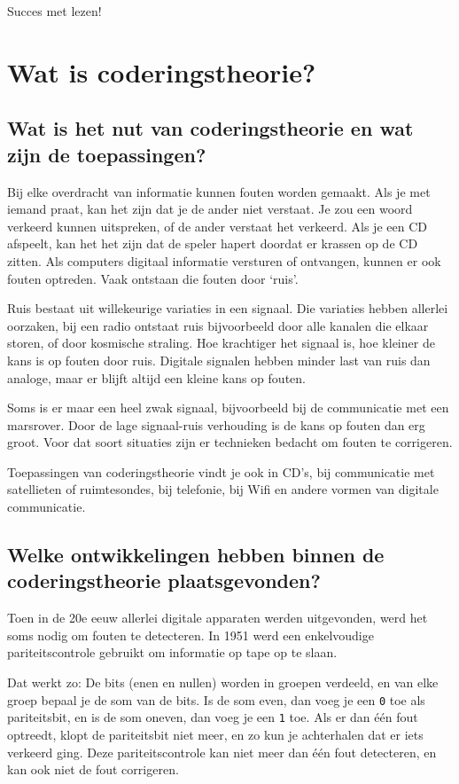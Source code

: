 \documentclass[a4paper]{article}
\begin{document}
Succes met lezen!

\section{Wat is coderingstheorie?}
\subsection{Wat is het nut van coderingstheorie en wat zijn de toepassingen?}
Bij elke overdracht van informatie kunnen fouten worden gemaakt. Als je met iemand praat, kan het zijn dat je de ander niet verstaat. Je zou een woord verkeerd kunnen uitspreken, of de ander verstaat het verkeerd. Als je een CD afspeelt, kan het het zijn dat de speler hapert doordat er krassen op de CD zitten. Als computers digitaal informatie versturen of ontvangen, kunnen er ook fouten optreden. Vaak ontstaan die fouten door ‘ruis’.

Ruis bestaat uit willekeurige variaties in een signaal. Die variaties hebben allerlei oorzaken, bij een radio ontstaat ruis bijvoorbeeld door alle kanalen die elkaar storen, of door kosmische straling. Hoe krachtiger het signaal is, hoe kleiner de kans is op fouten door ruis. Digitale signalen hebben minder last van ruis dan analoge, maar er blijft altijd een kleine kans op fouten.

Soms is er maar een heel zwak signaal, bijvoorbeeld bij de communicatie met een marsrover. Door de lage signaal-ruis verhouding is de kans op fouten dan erg groot. Voor dat soort situaties zijn er technieken bedacht om fouten te corrigeren.

Toepassingen van coderingstheorie vindt je ook in CD's, bij communicatie met satellieten of ruimtesondes, bij telefonie, bij Wifi en andere vormen van digitale communicatie.
\subsection{Welke ontwikkelingen hebben binnen de coderingstheorie plaatsgevonden?}
Toen in de 20e eeuw allerlei digitale apparaten werden uitgevonden, werd het soms nodig om fouten te detecteren. In 1951 werd een enkelvoudige pariteitscontrole gebruikt om informatie op tape op te slaan.

Dat werkt zo: De bits (enen en nullen) worden in groepen verdeeld, en van elke groep bepaal je de som van de bits. Is de som even, dan voeg je een \texttt{0} toe als pariteitsbit, en is de som oneven, dan voeg je een \texttt{1} toe. Als er dan één fout optreedt, klopt de pariteitsbit niet meer, en zo kun je achterhalen dat er iets verkeerd ging. Deze pariteitscontrole kan  niet meer dan één fout detecteren, en kan ook niet de fout corrigeren.
\end{document}
